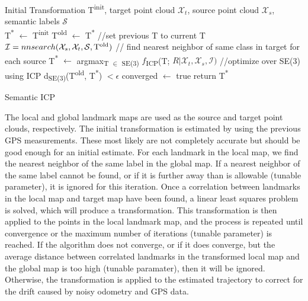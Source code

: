 \documentclass[letterpaper, 10 pt, conference]{ieeeconf}  %
\begin{document}
\begin{algorithm}[ht]
\label{alg:sicpse3}
\begin{algorithmic}[1]
\Require  Initial Transformation T\textsuperscript{init}, target point cloud $\mathcal{X}_t$, source point cloud $\mathcal{X}_s$, semantic labels $\mathcal{S}$\\
T\textsuperscript{*} $\leftarrow$ T\textsuperscript{init}
		\State T\textsuperscript{old} $\leftarrow$ T\textsuperscript{*} //set previous T to current T
		\State $\mathcal{I} = nnsearch{(\mathcal{X}_s, \mathcal{X}_t, \mathcal{S},  \mathrm{T\textsuperscript{old})}}$ // find nearest neighbor of same class in target for each source
		\State T\textsuperscript{*} $\leftarrow$ argmax\textsubscript{T $\in$ SE(3)} $f$\textsubscript{ICP}(T; $R|\mathcal{X}_t, \mathcal{X}_s, \mathcal{I})$ //optimize over SE(3) using ICP
		\If d\textsubscript{SE(3)}(T\textsuperscript{old}, T\textsuperscript{*}) $ < \epsilon$
			\State converged $\leftarrow$ true	
		\EndIf
	\EndWhile
	\State return T\textsuperscript{*}
\caption{Semantic ICP}
\end{algorithmic}
\end{algorithm}

The local and global landmark maps are used as the source and target point clouds, respectively. The initial transformation is estimated by using the previous GPS measurements. These most likely are not completely accurate but should be good enough for an initial estimate. For each landmark in the local map, we find the nearest neighbor \cite{cNN} of the same label in the global map. If a nearest neighbor of the same label cannot be found, or if it is further away than is allowable (tunable parameter), it is ignored for this iteration. Once a correlation between landmarks in the local map and target map have been found, a linear least squares problem is solved, which will produce a transformation. This transformation is then applied to the points in the local landmark map, and the process is repeated until convergence or the maximum number of iterations (tunable parameter) is reached. If the algorithm does not converge, or if it does converge, but the average distance between correlated landmarks in the transformed local map and the global map is too high (tunable paramater), then it will be ignored. Otherwise, the transformation is applied to the estimated trajectory to correct for the drift caused by noisy odometry and GPS data.
\end{document}
